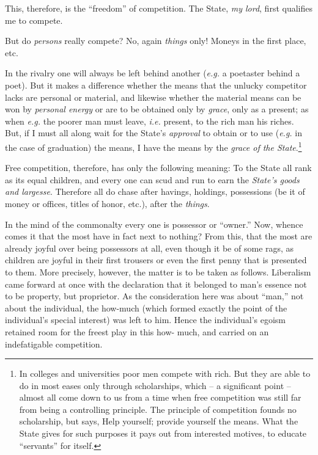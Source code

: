 This, therefore, is the ``freedom'' of competition. The State, \textit{my 
lord}, first qualifies me to compete.

But do \textit{persons} really compete? No, again \textit{things} only! Moneys 
in the first place, etc.

In the rivalry one will always be left behind another (\textit{e.g.} a 
poetaster behind a poet). But it makes a difference whether the means that the 
unlucky competitor lacks are personal or material, and likewise whether the 
material means can be won by \textit{personal energy} or are to be obtained 
only by \textit{grace}, only as a present; as when \textit{e.g.} the poorer 
man must leave, \textit{i.e.} present, to the rich man his riches. But, if I 
must all along wait for the State's \textit{approval} to obtain or to use 
(\textit{e.g.} in the case of graduation) the means, I have the means by the 
\textit{grace of the State}.\footnote{In colleges and universities poor men 
compete with rich. But they are able to do in most eases only through 
scholarships, which -- a significant point -- almost all come down to us from 
a time when free competition was still far from being a controlling principle. 
The principle of competition founds no scholarship, but says, Help yourself; 
provide yourself the means. What the State gives for such purposes it pays out 
from interested motives, to educate ``servants'' for itself.}

Free competition, therefore, has only the following meaning: To the State all 
rank as its equal children, and every one can scud and run to earn the 
\textit{State's goods and largesse}. Therefore all do chase after havings, 
holdings, possessions (be it of money or offices, titles of honor, etc.), 
after the \textit{things}.

In the mind of the commonalty every one is possessor or ``owner.'' Now, 
whence comes it that the most have in fact next to nothing? From this, that 
the most are already joyful over being possessors at all, even though it be of 
some rags, as children are joyful in their first trousers or even the first 
penny that is presented to them. More precisely, however, the matter is to be 
taken as follows. Liberalism came forward at once with the declaration that it 
belonged to man's essence not to be property, but proprietor. As the 
consideration here was about ``man,'' not about the individual, the how-much 
(which formed exactly the point of the individual's special interest) was left 
to him. Hence the individual's egoism retained room for the freest play in 
this how- much, and carried on an indefatigable competition.

